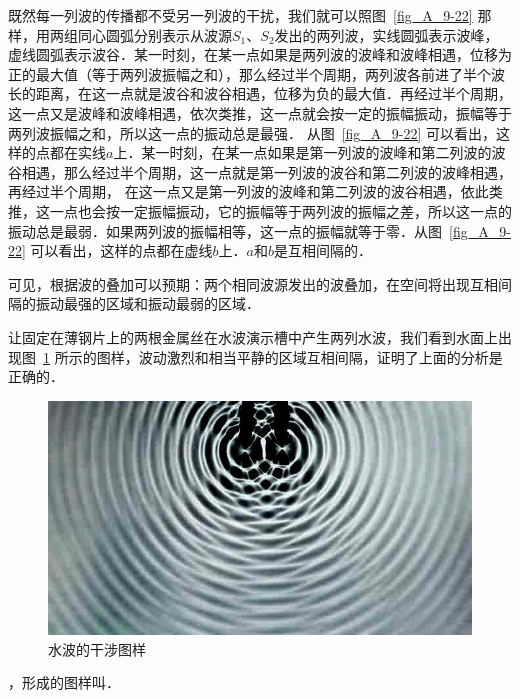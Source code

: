 既然每一列波的传播都不受另一列波的干扰，我们就可以照图~\ref{fig_A_9-22} 那样，用两组同心圆弧分别表示从波源$S_1$、$S_2$发出的两列波，实线圆弧表示波峰，虚线圆弧表示波谷．某一时刻，在某一点如果是两列波的波峰和波峰相遇，位移为正的最大值（等于两列波振幅之和），那么经过半个周期，两列波各前进了半个波长的距离，在这一点就是波谷和波谷相遇，位移为负的最大值．再经过半个周期，这一点又是波峰和波峰相遇，依次类推，这一点就会按一定的振幅振动，振幅等于两列波振幅之和，所以这一点的振动总是最强．
从图~\ref{fig_A_9-22} 可以看出，这样的点都在实线$a$上．某一时刻，在某一点如果是第一列波的波峰和第二列波的波谷相遇，那么经过半个周期，这一点就是第一列波的波谷和第二列波的波峰相遇，再经过半个周期，
在这一点又是第一列波的波峰和第二列波的波谷相遇，依此类推，这一点也会按一定振幅振动，它的振幅等于两列波的振幅之差，所以这一点的振动总是最弱．如果两列波的振幅相等，这一点的振幅就等于零．从图~\ref{fig_A_9-22} 可以看出，这样的点都在虚线$b$上．$a$和$b$是互相间隔的．

可见，根据波的叠加可以预期：两个相同波源发出的波叠加，在空间将出现互相间隔的振动最强的区域和振动最弱的区域．

让固定在薄钢片上的两根金属丝在水波演示槽中产生两列水波，我们看到水面上出现图~\ref{fig_A_9-23} 所示的图样，波动激烈和相当平静的区域互相间隔，证明了上面的分析是正确的．
\begin{figure}[htbp]
    \centering
    \includegraphics[scale=0.8]{fig/A/9-23.jpg}
    \caption{水波的干涉图样}\label{fig_A_9-23}
\end{figure}

，形成的图样叫．


